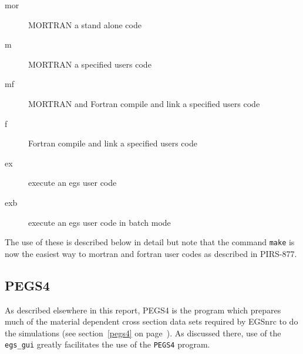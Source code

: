      
  
\begin{description}
\item[mor]	MORTRAN a stand alone code
\item[m]	MORTRAN a specified users code
\item[mf]	MORTRAN and Fortran compile and link a specified users code
\item[f]	Fortran compile and link a specified users code
\item[ex]	execute an egs user code
\item[exb]	execute an egs user code in batch mode
\end{description}
The use of these is described below in detail but note that the command
{\tt make} is now the easiest way to mortran and fortran user codes as
described in PIRS-877\cite{Ka03}.




\newpage
\subsection{PEGS4}
\label{pegs4_sc}

As described elsewhere in this report, PEGS4 is the program which
prepares much of the material dependent cross section data sets required
by EGSnrc to do the simulations (see section~\ref{pegs4} on
page~\pageref{pegs4}).  As discussed there, use of the {\tt egs\_gui}
greatly facilitates the use of the {\tt PEGS4} program.


